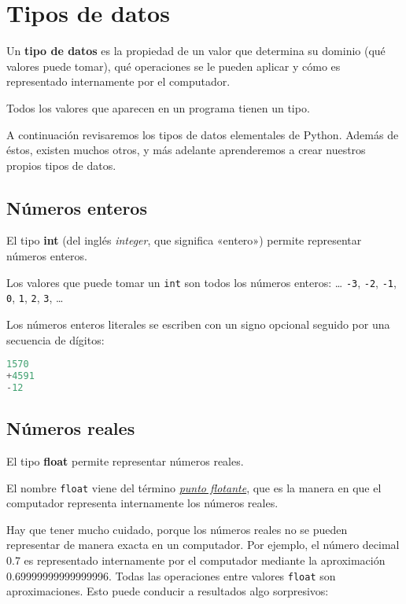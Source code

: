 \chapter{Tipos de datos}

Un \textbf{tipo de datos} es la propiedad de un valor que determina su
dominio (qué valores puede tomar), qué operaciones se le pueden aplicar
y cómo es representado internamente por el computador.

Todos los valores que aparecen en un programa tienen un tipo.

A continuación revisaremos los tipos de datos elementales de Python.
Además de éstos, existen muchos otros, y más adelante aprenderemos a
crear nuestros propios tipos de datos.

\section{Números enteros}

El tipo \textbf{int} (del inglés \emph{integer}, que significa «entero»)
permite representar números enteros.

Los valores que puede tomar un \lstinline!int! son todos los números
enteros: \ldots{} \lstinline!-3!, \lstinline!-2!, \lstinline!-1!,
\lstinline!0!, \lstinline!1!, \lstinline!2!, \lstinline!3!, \ldots{}

Los números enteros literales se escriben con un signo opcional seguido
por una secuencia de dígitos:

\begin{lstlisting}[language=py]
1570
+4591
-12
\end{lstlisting}

\section{Números reales}

El tipo \textbf{float} permite representar números reales.

El nombre \lstinline!float! viene del término
\href{http://es.wikipedia.org/wiki/Punto\_flotante}{\emph{punto flotante}}, que
es la manera en que el computador representa internamente los números
reales.

Hay que tener mucho cuidado, porque los números reales no se pueden
representar de manera exacta en un computador. Por ejemplo, el número
decimal 0.7 es representado internamente por el computador mediante la
aproximación 0.69999999999999996. Todas las operaciones entre valores
\lstinline!float! son aproximaciones. Esto puede conducir a resultados
algo sorpresivos:

